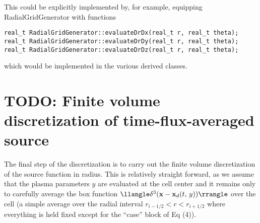\documentclass[11pt,a4paper]{article}
\renewcommand{\b}[1]{\ensuremath{ {\bf #1 } }}
\begin{document}
This could be explicitly implemented by, for example, equipping RadialGridGenerator with functions
\begin{verbatim}
real_t RadialGridGenerator::evaluateDrDx(real_t r, real_t theta);
real_t RadialGridGenerator::evaluateDrDy(real_t r, real_t theta);
real_t RadialGridGenerator::evaluateDrDz(real_t r, real_t theta);
\end{verbatim}
which would be implemented in the various derived classes. 

\section*{TODO: Finite volume discretization of time-flux-averaged source}
The final step of the discretization is to carry out the finite volume discretization of the source function in radius. This is relatively straight forward, as we assume that the plasma parameters $y$ are evaluated at the cell center and it remains only to carefully average the box function $\llangle\delta^3( \b{x} - \b{x}_d(t,\,y)) \rrangle $ over the cell (a simple average over the radial interval $r_{i-1/2} < r < r_{i+1/2}$ where everything is held fixed except for the ``case'' block of Eq (4)).
\end{document}
